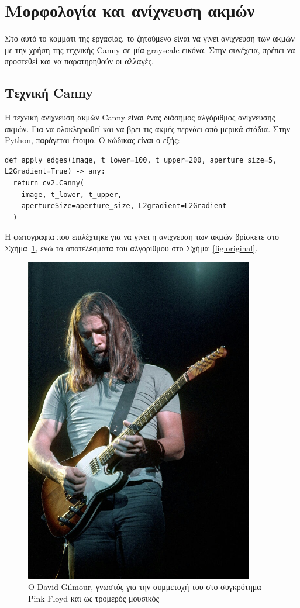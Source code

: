 \label{Chapter2}

\section{Μορφολογία και ανίχνευση ακμών}

Στο αυτό το κομμάτι της εργασίας, το ζητούμενο είναι να γίνει ανίχνευση των ακμών με την χρήση της τεχνικής Canny σε μία grayscale εικόνα. Στην συνέχεια, πρέπει να προστεθεί και να παρατηρηθούν οι αλλαγές.

\subsection{Τεχνική Canny}

H τεχνική ανίχνευση ακμών Canny είναι ένας διάσημος αλγόριθμος ανίχνευσης ακμών. Για να ολοκληρωθεί και να βρει τις ακμές περνάει από μερικά στάδια. Στην Python, παράγεται έτοιμο. Ο κώδικας είναι ο εξής:

\begin{verbatim}
def apply_edges(image, t_lower=100, t_upper=200, aperture_size=5, L2Gradient=True) -> any:
  return cv2.Canny(
    image, t_lower, t_upper,
    apertureSize=aperture_size, L2gradient=L2Gradient
  )
\end{verbatim}

Η φωτογραφία που επιλέχτηκε για να γίνει η ανίχνευση των ακμών βρίσκετε στο Σχήμα~\ref{fig:guitar_god}, ενώ τα αποτελέσματα του αλγορίθμου στο Σχήμα~\ref{fig:original}.

\begin{figure}[H]
  \centering
  \includegraphics[width=100mm]{Figures/david_gilmour}
  \caption[David Gilmour]{Ο David Gilmour, γνωστός για την συμμετοχή του στο συγκρότημα Pink Floyd και ως τρομερός μουσικός}
  \label{fig:guitar_god}
\end{figure}

